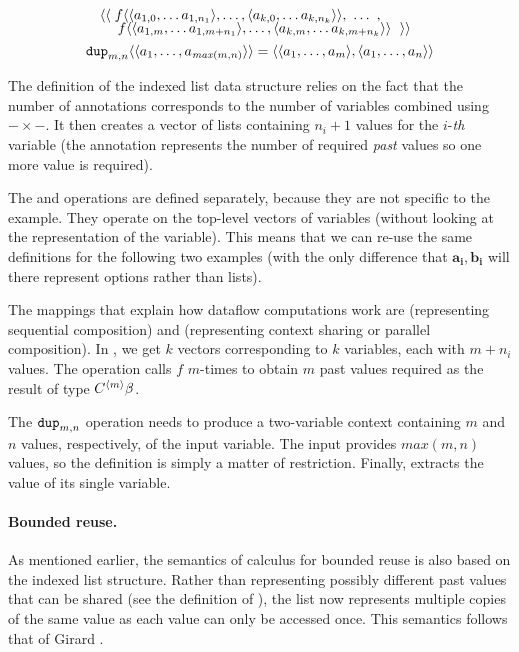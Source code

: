 \begin{example}
\begin{equation*}
\begin{array}{l}
\quad \langle\langle\; f \langle \langle a_{1,0}, \ldots a_{1,{n_1}} \rangle, \ldots, \langle a_{k,0}, \ldots a_{k,{n_k}} \rangle \rangle, ~\ldots~, \\[-0.25em]
\quad ~~~\; f \langle \langle a_{1,m}, \ldots a_{1,m+{n_1}} \rangle, \ldots, \langle a_{k,m}, \ldots a_{k,m+{n_k}} \rangle \rangle~\; \rangle\rangle
\\[0.45em]
\textnormal{\ttfamily dup}_{m, n} \langle \langle a_1, \ldots, a_{\mathit{max}(m,n)} \rangle \rangle =
   \langle \langle a_1, \ldots, a_m \rangle, \langle a_1, \ldots, a_n \rangle \rangle
\end{array}
\end{equation*}
\end{example}

\noindent
The definition of the indexed list data structure relies on the fact that the number of annotations
corresponds to the number of variables combined using $-\times-$. It then creates a vector of lists
containing $n_i+1$ values for the $i$-\textit{th} variable (the annotation represents the number of
required \emph{past} values so one more value is required).

The  and  operations are defined separately, because they are not specific
to the example. They operate on the top-level vectors of variables (without looking at the
representation of the variable). This means that we can re-use the same definitions for the following
two examples (with the only difference that $\mathbf{a_i}, \mathbf{b_i}$ will there represent options
rather than lists).

The mappings that explain how dataflow computations work are  (representing sequential
composition) and  (representing context sharing or parallel composition). In ,
we get $k$ vectors corresponding to $k$ variables, each with $m+n_i$ values. The operation calls
$f$ $m$-times to obtain $m$ past values required as the result of type $C^{\langle m \rangle}\beta$.

The $\textnormal{\ttfamily dup}_{m,n}$ operation needs to produce a two-variable context containing $m$ and $n$ values,
respectively, of the input variable. The input provides $\mathit{max}(m, n)$ values, so the definition
is simply a matter of restriction. Finally,  extracts the value of its single variable.

\paragraph{Bounded reuse.}
As mentioned earlier, the semantics of calculus for bounded reuse is also based on the indexed list
structure. Rather than representing possibly different past values that can be shared (see the
definition of ), the list now represents multiple copies of the same value as each value
can only be accessed once. This semantics follows that of Girard \cite{logic-bounded}.

